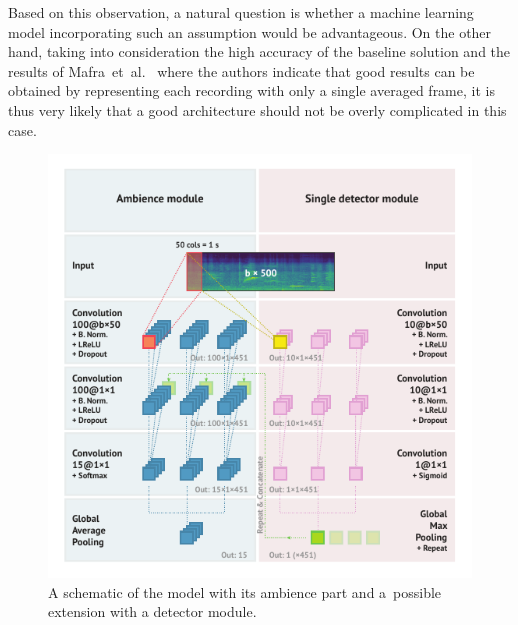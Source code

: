 \documentclass{article}
\begin{document}
\begin{sloppy}
Based on this observation, a natural question is whether a machine learning model incorporating such an assumption would be advantageous. On the other hand, taking into consideration the high accuracy of the baseline solution and the results of Mafra~et~al.~\cite{mafra2016} where the authors indicate that good results can be obtained by representing each recording with only a single averaged frame, it is thus very likely that a good architecture should not be overly complicated in this case.

\begin{figure}[t]
  \centering
  \centerline{\includegraphics[trim={3mm, 3mm, 3mm, 3mm},clip,width=\columnwidth]{figures/model.pdf}}
  \caption{A schematic of the model with its ambience part and a~possible extension with a detector module.}
  \label{fig:model}
  \vspace{-8pt}
\end{figure}


\end{sloppy}
\end{document}
